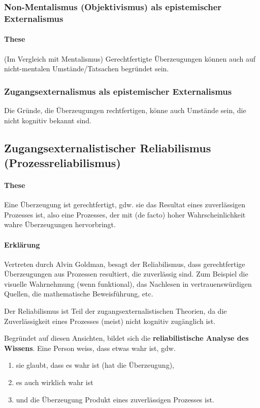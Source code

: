 \documentclass[../main.tex]{subfiles}
\begin{document}
\subsubsection{Non-Mentalismus (Objektivismus) als epistemischer Externalismus}
\paragraph{These} (Im Vergleich mit Mentalismus) Gerechtfertigte Überzeugungen können auch auf nicht-mentalen Umstände/Tatsachen begründet sein. 

\subsubsection{Zugangsexternalismus als epistemischer Externalismus}
Die Gründe, die Überzeugungen rechtfertigen, könne auch Umstände sein, die nicht kognitiv bekannt sind. 

\subsection{Zugangsexternalistischer Reliabilismus (Prozessreliabilismus)}
\paragraph{These} Eine Überzeugung ist gerechtfertigt, gdw. sie das Resultat eines zuverlässigen Prozesses ist, also eine Prozesses, der mit (de facto) hoher Wahrscheinlichkeit wahre Überzeugungen hervorbringt. 
\paragraph{Erklärung} Vertreten durch Alvin Goldman, besagt der Reliabilismus, dass gerechtfertige Überzeugungen aus Prozessen resultiert, die zuverlässig sind. Zum Beispiel die visuelle Wahrnehmung (wenn funktional), das Nachlesen in vertrauenswürdigen Quellen, die mathematische Beweisführung, etc. 

Der Reliabilismus ist Teil der zugangsexternalistischen Theorien, da die Zuverlässigkeit eines Prozesses (meist) nicht kognitiv zugänglich ist. 

Begründet auf diesen Ansichten, bildet sich die \textbf{reliabilistische Analyse des Wissens}. Eine Person weiss, dass etwas wahr ist, gdw. 
\begin{enumerate}
	\item sie glaubt, dass es wahr ist (hat die Überzeugung),
	\item es auch wirklich wahr ist
	\item und die Überzeugung Produkt eines zuverlässigen Prozesses ist. 
\end{enumerate}
\end{document}
